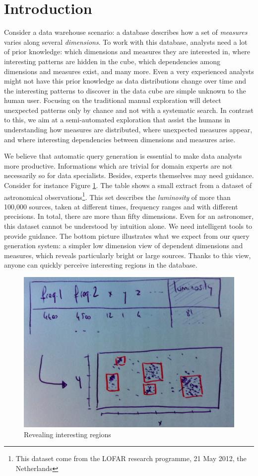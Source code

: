 \section{Introduction}
\label{sec:intro}

Consider a data warehouse scenario: a database describes how a set of \emph{measures} varies along several \emph{dimensions}. To work with this database, analysts need a lot of prior knowledge: which dimensions and measures they are interested in, where interesting patterns are hidden in the cube, which dependencies among dimensions and measures exist, and many more. Even a very experienced analysts might not have this prior knowledge as data distributions change over time and the interesting patterns to discover in the data cube are simple unknown to the human user. Focusing on the traditional manual exploration will detect unexpected patterns only by chance and not with a systematic search. In contrast to this, we aim at a semi-automated exploration that assist the humans in understanding how measures are distributed, where unexpected measures appear, and where interesting dependencies between dimensions and measures arise.

We believe that automatic query generation is essential to make data analysts more
productive. Informations which are trivial for domain experts are not
necessarily so for data specialists. Besides, experts themselves may need
guidance. Consider for instance Figure \ref{intro}. The table shows a small
extract from a dataset of astronomical observations\footnote{This dataset come
from the LOFAR research programme, 21 May 2012, the Netherlands}. This set
describes the \emph{luminosity} of more than 100,000 sources, taken at
different times, frequency ranges and with different precisions. In total,
there are more than fifty dimensions. Even for an astronomer, this dataset
cannot be understood by intuition alone. We need intelligent tools
to provide guidance.  The bottom picture illustrates what
we expect from our query generation system: a simpler low dimension view of dependent dimensions and measures, which reveals
particularly bright or large sources. Thanks to this view, anyone can 
quickly perceive interesting regions in the database.

\begin{figure}[t!]
\centering
\includegraphics[width=0.8\columnwidth]{images/intro}
\caption{Revealing interesting regions}
\label{intro}
\end{figure}

